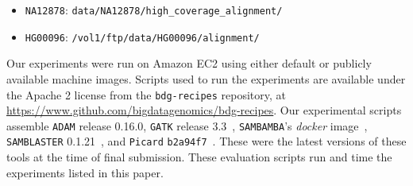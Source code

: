 \documentclass{acm_proc_article-sp}
\begin{document}
\begin{itemize}
\item \texttt{NA12878}: \texttt{data/NA12878/high\_coverage\_alignment/}
\item \texttt{HG00096}: \texttt{/vol1/ftp/data/HG00096/alignment/}
\end{itemize}

Our experiments were run on Amazon EC2 using either default or publicly available machine images.
Scripts used to run the experiments are available under the Apache 2 license from the \texttt{bdg-recipes} 
repository, at \url{https://www.github.com/bigdatagenomics/bdg-recipes}. Our experimental scripts
assemble \texttt{ADAM} release 0.16.0, \texttt{GATK} release 3.3~\cite{depristo11}, \texttt{SAMBAMBA}'s \emph{docker}
image~\cite{sambamba}, \texttt{SAMBLASTER} 0.1.21~\cite{faust14}, and \texttt{Picard}
\texttt{b2a94f7}~\cite{picard}. These were the latest versions of these tools at the time of final submission. These
evaluation scripts run and time the experiments listed in this paper.

\balance
\end{document}
